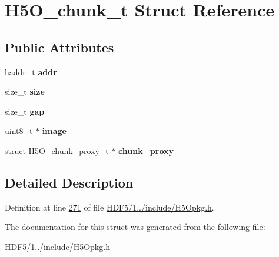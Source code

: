 \hypertarget{struct_h5_o__chunk__t}{}\section{H5\+O\+\_\+chunk\+\_\+t Struct Reference}
\label{struct_h5_o__chunk__t}
\subsection*{Public Attributes}
\begin{DoxyCompactItemize}
\item 
\mbox{\label{struct_h5_o__chunk__t_a12594b712dbf3ed77fcfc2304b211d7a}} 
haddr\+\_\+t {\bfseries addr}
\item 
\mbox{\label{struct_h5_o__chunk__t_aedd314f06236408552769f5c5e5d90c0}} 
size\+\_\+t {\bfseries size}
\item 
\mbox{\label{struct_h5_o__chunk__t_a71c59285e6b89354a064abbf284b999f}} 
size\+\_\+t {\bfseries gap}
\item 
\mbox{\label{struct_h5_o__chunk__t_ab55515767be986cdb6f99e8e0037d45d}} 
uint8\+\_\+t $\ast$ {\bfseries image}
\item 
\mbox{\label{struct_h5_o__chunk__t_af0529e4b144c15557c263c1aef2407b9}} 
struct \hyperlink{struct_h5_o__chunk__proxy__t}{H5\+O\+\_\+chunk\+\_\+proxy\+\_\+t} $\ast$ {\bfseries chunk\+\_\+proxy}
\end{DoxyCompactItemize}


\subsection{Detailed Description}


Definition at line \hyperlink{_h_d_f5_21_810_81_2include_2_h5_opkg_8h_source_l00271}{271} of file \hyperlink{_h_d_f5_21_810_81_2include_2_h5_opkg_8h_source}{H\+D\+F5/1../include/\+H5\+Opkg.\+h}.



The documentation for this struct was generated from the following file\+:\begin{DoxyCompactItemize}
\item 
H\+D\+F5/1../include/\+H5\+Opkg.\+h\end{DoxyCompactItemize}
